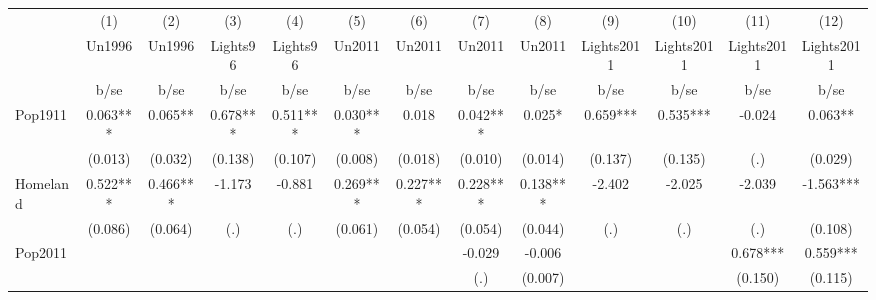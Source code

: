 {
\def\sym#1{\ifmmode^{#1}\else\(^{#1}\)\fi}
\begin{tabular}{l*{12}{c}}
\hline\hline
                    &\multicolumn{1}{c}{(1)}&\multicolumn{1}{c}{(2)}&\multicolumn{1}{c}{(3)}&\multicolumn{1}{c}{(4)}&\multicolumn{1}{c}{(5)}&\multicolumn{1}{c}{(6)}&\multicolumn{1}{c}{(7)}&\multicolumn{1}{c}{(8)}&\multicolumn{1}{c}{(9)}&\multicolumn{1}{c}{(10)}&\multicolumn{1}{c}{(11)}&\multicolumn{1}{c}{(12)}\\
                    &\multicolumn{1}{c}{Un1996}&\multicolumn{1}{c}{Un1996}&\multicolumn{1}{c}{Lights96}&\multicolumn{1}{c}{Lights96}&\multicolumn{1}{c}{Un2011}&\multicolumn{1}{c}{Un2011}&\multicolumn{1}{c}{Un2011}&\multicolumn{1}{c}{Un2011}&\multicolumn{1}{c}{Lights2011}&\multicolumn{1}{c}{Lights2011}&\multicolumn{1}{c}{Lights2011}&\multicolumn{1}{c}{Lights2011}\\
                    &        b/se   &        b/se   &        b/se   &        b/se   &        b/se   &        b/se   &        b/se   &        b/se   &        b/se   &        b/se   &        b/se   &        b/se   \\
\hline
Pop1911             &       0.063***&       0.065** &       0.678***&       0.511***&       0.030***&       0.018   &       0.042***&       0.025*  &       0.659***&       0.535***&      -0.024   &       0.063** \\
                    &     (0.013)   &     (0.032)   &     (0.138)   &     (0.107)   &     (0.008)   &     (0.018)   &     (0.010)   &     (0.014)   &     (0.137)   &     (0.135)   &         (.)   &     (0.029)   \\
Homeland            &       0.522***&       0.466***&      -1.173   &      -0.881   &       0.269***&       0.227***&       0.228***&       0.138***&      -2.402   &      -2.025   &      -2.039   &      -1.563***\\
                    &     (0.086)   &     (0.064)   &         (.)   &         (.)   &     (0.061)   &     (0.054)   &     (0.054)   &     (0.044)   &         (.)   &         (.)   &         (.)   &     (0.108)   \\
Pop2011             &               &               &               &               &               &               &      -0.029   &      -0.006   &               &               &       0.678***&       0.559***\\
                    &               &               &               &               &               &               &         (.)   &     (0.007)   &               &               &     (0.150)   &     (0.115)   \\

\end{tabular}}
